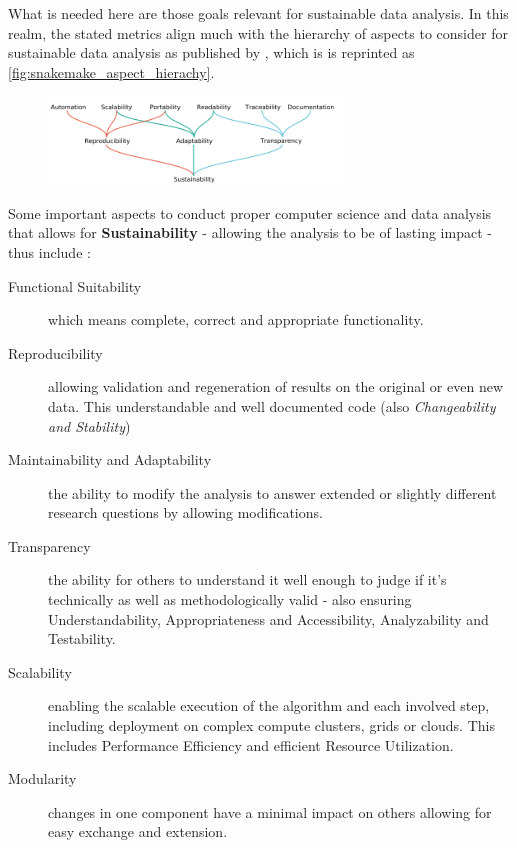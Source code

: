 What is needed here are those goals relevant for sustainable data analysis. In this realm, the stated metrics align much with the hierarchy of aspects to consider for sustainable data analysis as published by \textcite{Molder2021a}, which is is reprinted as \autoref{fig:snakemake_aspect_hierachy}.

\begin{figure}[H]
	\centering
	\includegraphics[width=0.7\textwidth]{graphics/stolenfigures/snakemake_aspect_hierachy.png}
\end{figure}

Some important aspects to conduct proper computer science and data analysis that allows for \textbf{Sustainability} - allowing the analysis to be of lasting impact - thus include \cite{Molder2021a, 2013ISOI}:

\begin{description}
    \item[Functional Suitability] which means complete, correct and appropriate functionality.
	\item[Reproducibility] \ie allowing validation and regeneration of results on the original or even new data. This understandable and well documented code (also \textit{Changeability and Stability})
	\item[Maintainability and Adaptability] the ability to modify the analysis to answer extended or slightly different research questions by allowing modifications.
	\item[Transparency] \ie the ability for others to understand it well enough to judge if it's technically as well as methodologically valid - also ensuring Understandability, Appropriateness and Accessibility, Analyzability and Testability.
	\item[Scalability] \ie enabling the scalable execution of the algorithm and each involved step, including deployment on complex compute clusters, grids or clouds. This includes Performance Efficiency and efficient Resource Utilization.
	\item[Modularity] \ie changes in one component have a minimal impact on others allowing for easy exchange and extension.
\end{description}


